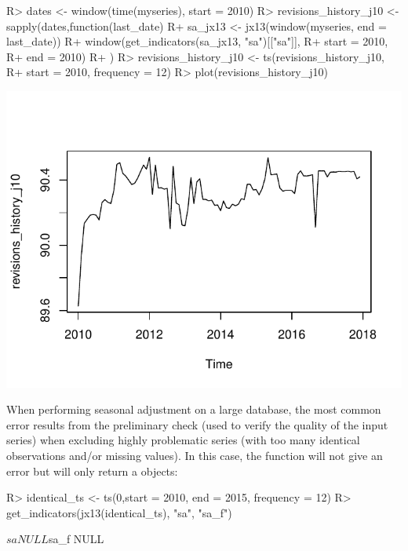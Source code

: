 \documentclass[article]{jss}
\begin{document}
\begin{CodeChunk}

\begin{CodeInput}
R> dates <- window(time(myseries), start = 2010)
R> revisions_history_j10 <- sapply(dates,function(last_date){
R+   sa_jx13 <- jx13(window(myseries, end = last_date))
R+   window(get_indicators(sa_jx13, "sa")[["sa"]],
R+          start = 2010,
R+          end = 2010)
R+ })
R> revisions_history_j10 <- ts(revisions_history_j10,
R+                             start = 2010, frequency = 12)
R> plot(revisions_history_j10)
\end{CodeInput}


\begin{center}\includegraphics{img/img-unnamed-chunk-28-1} \end{center}

\end{CodeChunk}

When performing seasonal adjustment on a large database, the most common
error results from the preliminary check (used to verify the quality of
the input series) when excluding highly problematic series (with too
many identical observations and/or missing values). In this case, the
 function will not give an error but
 will only return a  objects:

\begin{CodeChunk}

\begin{CodeInput}
R> identical_ts <- ts(0,start = 2010, end = 2015, frequency = 12)
R> get_indicators(jx13(identical_ts), "sa", "sa_f")
\end{CodeInput}

\begin{CodeOutput}
$sa
NULL

$sa_f
NULL
\end{CodeOutput}
\end{CodeChunk}
\end{document}
